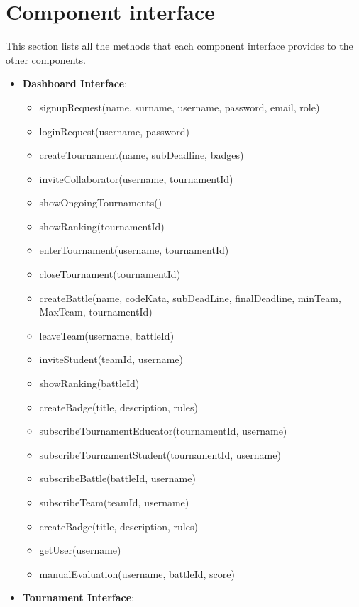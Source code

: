 \section{Component interface}
This section lists all the methods that each component interface provides to the other components.
\begin{itemize}
    \item \textbf{Dashboard Interface}:
        \begin{itemize}
            \item signupRequest(name, surname, username, password, email, role) 
            \item loginRequest(username, password)
            \item createTournament(name, subDeadline, badges)  
            \item inviteCollaborator(username, tournamentId) 
            \item showOngoingTournaments()
            \item showRanking(tournamentId)
            \item enterTournament(username, tournamentId)
            \item closeTournament(tournamentId)
            \item createBattle(name, codeKata, subDeadLine, finalDeadline, minTeam, MaxTeam, tournamentId)
            \item leaveTeam(username, battleId)
            \item inviteStudent(teamId, username)
            \item showRanking(battleId)
            \item createBadge(title, description, rules)
            \item subscribeTournamentEducator(tournamentId, username)
            \item subscribeTournamentStudent(tournamentId, username)
            \item subscribeBattle(battleId, username)
            \item subscribeTeam(teamId, username)
            \item createBadge(title, description, rules)
            \item getUser(username)
            \item manualEvaluation(username, battleId, score)
        \end{itemize}
    \item\textbf{Tournament Interface}:
        \begin{itemize}

\end{itemize}
\end{itemize}
